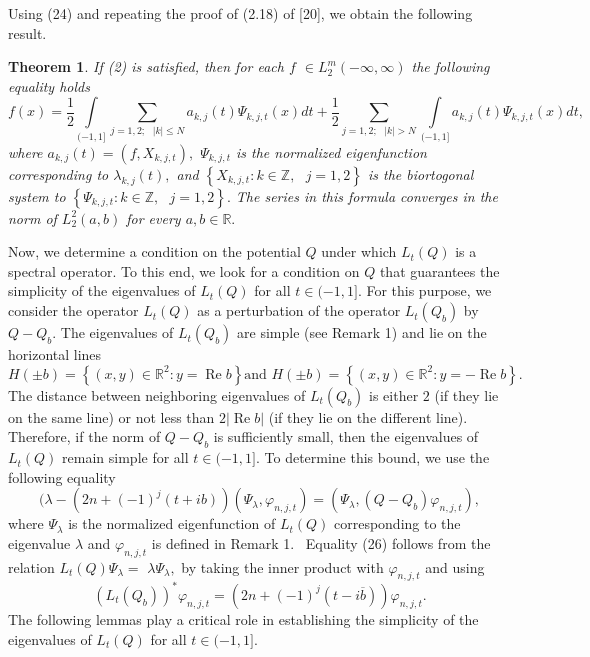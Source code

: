 \documentclass{article}%
\newtheorem{theorem}{Theorem}
{}
\begin{document}
Using (24) and repeating the proof of (2.18) of [20], we obtain the following result.

\begin{theorem}
If (2) is satisfied, then for each $f$ $\in L_{2}^{m}(-\infty,\infty)$ the
following equality holds
\[
f(x)=\frac{1}{2}\int\limits_{(-1,1]}%
{\displaystyle\sum\limits_{j=1,2;\text{ }\left\vert k\right\vert \leq N}}
a_{k,j}(t)\Psi_{k,j,t}(x)dt+\frac{1}{2}%
{\displaystyle\sum\limits_{j=1,2;\text{ }\left\vert k\right\vert >N_{{}}}}
\int\limits_{(-1,1]}a_{k,j}(t)\Psi_{k,j,t}(x)dt,
\]
where $a_{k,j}(t)=(f,X_{k,j,t}),$ $\Psi_{k,j,t}$ is the normalized
eigenfunction corresponding to $\lambda_{k,j}(t),$ and $\left\{
X_{k,j,t}:k\in\mathbb{Z},\text{ }j=1,2\right\}  $ is the biortogonal system to
$\left\{  \Psi_{k,j,t}:k\in\mathbb{Z},\text{ }j=1,2\right\}  .$ The series in
this formula converges in the norm of $L_{2}^{2}(a,b)$ for every
$a,b\in\mathbb{R}.$
\end{theorem}

Now, we determine a condition on the potential $Q$ under which $L_{t}(Q)$ is a
spectral operator. To this end, we look for a condition on $Q$ that guarantees
the simplicity of the eigenvalues of $L_{t}(Q)$ for all $t\in(-1,1].$ For this
purpose, we consider the operator $L_{t}(Q)$ as a perturbation of the operator
$L_{t}(Q_{b})$ by $Q-Q_{b}.$ The eigenvalues of $L_{t}(Q_{b})$ are simple (see
Remark 1) and lie on the horizontal lines
\begin{equation}
H(\pm b)=\left\{  (x,y)\in\mathbb{R}^{2}:y=\operatorname{Re}b\right\}  \text{
and }H(\pm b)=\left\{  (x,y)\in\mathbb{R}^{2}:y=-\operatorname{Re}b\right\}  .
\tag{25}%
\end{equation}
The distance between neighboring eigenvalues of $L_{t}(Q_{b})$ is either $2$
(if they lie on the same line) or not less than $2\left\vert \operatorname{Re}%
b\right\vert $ (if they lie on the different line). Therefore, if the norm of
$Q-Q_{b}$ is sufficiently small, then the eigenvalues of $L_{t}(Q)$ remain
simple for all $t\in(-1,1].$ To determine this bound, we use the following
equality
\begin{equation}
(\lambda-(2n+\left(  -1\right)  ^{j}(t+ib))(\Psi_{\lambda},\varphi
_{n,j,t})=(\Psi_{\lambda},(Q-Q_{b})\varphi_{n,j,t}), \tag{26}%
\end{equation}
where $\Psi_{\lambda}$ is the normalized eigenfunction of $L_{t}(Q)$
corresponding to the eigenvalue $\lambda$ and $\varphi_{n,j,t}$ is defined in
Remark 1. \ Equality (26) follows from the relation $L_{t}(Q)\Psi_{\lambda}=$
$\lambda\Psi_{\lambda},$ by taking the inner product with $\varphi_{n,j,t}$
and using
\[
\left(  L_{t}(Q_{b})\right)  ^{\ast}\varphi_{n,j,t}=(2n+\left(  -1\right)
^{j}(t-i\overline{b}))\varphi_{n,j,t}.
\]
The following lemmas play a critical role in establishing the simplicity of
the eigenvalues of $L_{t}(Q)$ for all $t\in(-1,1].$
\end{document}
